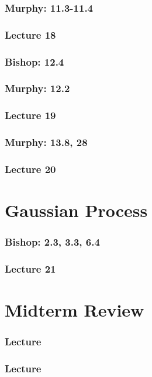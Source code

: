 \documentclass[english, 11pt]{article}
\begin{document}
		\subsubsection{Murphy: 11.3-11.4}
		\subsubsection{Lecture 18}

		\subsubsection{Bishop: 12.4}
		\subsubsection{Murphy: 12.2}
		\subsubsection{Lecture 19}

		\subsubsection{Murphy: 13.8, 28}
		\subsubsection{Lecture 20}

\section{Gaussian Process}
		\subsubsection{Bishop: 2.3, 3.3, 6.4}
		\subsubsection{Lecture 21}

\section{Midterm Review}
		\subsubsection{Lecture }

		\subsubsection{Lecture }
\end{document}
